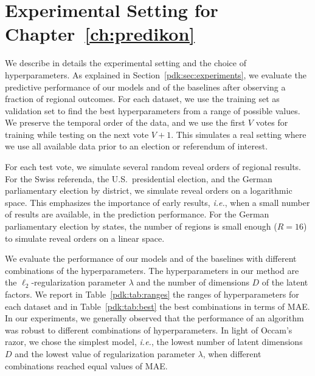 \section{Experimental Setting for Chapter~\ref{ch:predikon}}
\label{pdk:app:experimental_setting}

We describe in details the experimental setting and the choice of hyperparameters.
As explained in Section~\ref{pdk:sec:experiments}, we evaluate the predictive performance of our models and of the baselines after observing a fraction of regional outcomes.
For each dataset, we use the training set as validation set to find the best hyperparameters from a range of possible values.
We preserve the temporal order of the data, and we use the first $V$ votes for training while testing on the next vote $V+1$.
This simulates a real setting where we use all available data prior to an election or referendum of interest.

For each test vote, we simulate several random reveal orders of regional results.
For the Swiss referenda, the U.S.\ presidential election, and the German parliamentary election by district, we simulate reveal orders on a logarithmic space.
This emphasizes the importance of early results, \textit{i.e.}, when a small number of results are available, in the prediction performance.
For the German parliamentary election by states, the number of regions is small enough ($R=16$) to simulate reveal orders on a linear space.

We evaluate the performance of our models and of the baselines with different combinations of the hyperparameters.
The hyperparameters in our method are the $\ell_2$-regularization parameter $\lambda$ and the number of dimensions $D$ of the latent factors.
We report in Table~\ref{pdk:tab:ranges} the ranges of hyperparameters for each dataset and in Table~\ref{pdk:tab:best} the best combinations in terms of MAE.
In our experiments, we generally observed that the performance of an algorithm was robust to different combinations of hyperparameters.
In light of Occam's razor, we chose the simplest model, \textit{i.e.}, the lowest number of latent dimensions $D$ and the lowest value of regularization parameter $\lambda$, when different combinations reached equal values of MAE.

